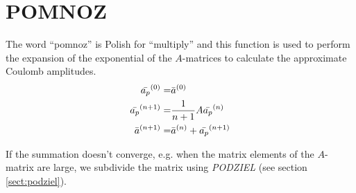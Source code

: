 \section{POMNOZ}
\label{sect:pomnoz}

\noindent The word ``pomnoz'' is Polish for ``multiply'' and this function
is used to perform the expansion of the exponential of the $A$-matrices to
calculate the approximate Coulomb amplitudes.\\

\begin{eqnarray}
\bar{a_p}^{(0)} =& \bar{a}^{(0)}\\
\bar{a_p}^{(n+1)} =& {1 \over n + 1} A \bar{a_p}^{(n)}\nonumber\\
\bar{a}^{(n+1)} =& \bar{a}^{(n)} + \bar{a_p}^{(n+1)}\nonumber\\
\end{eqnarray}

\noindent If the summation doesn't converge, e.g. when the matrix elements
of the $A$-matrix are large, we subdivide the matrix using {\em PODZIEL}
(see section \ref{sect:podziel}).\\

